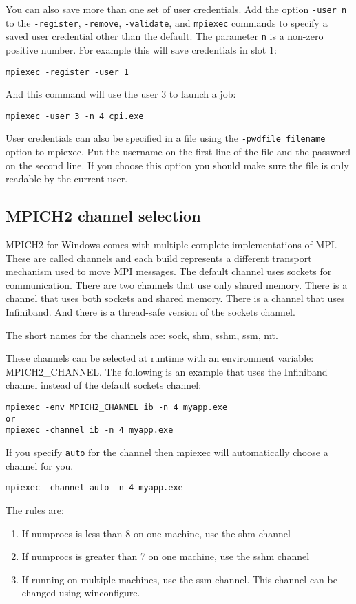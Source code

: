 \documentclass[dvipdfm,11pt]{article}
\begin{document}
You can also save more than one set of user credentials.  Add the option \texttt{-user n}
to the \texttt{-register}, \texttt{-remove}, \texttt{-validate}, and \texttt{mpiexec}
commands to specify a saved user credential other than the default.  The parameter \texttt{n}
is a non-zero positive number.  For example this will save credentials in slot 1:
\begin{verbatim}
mpiexec -register -user 1
\end{verbatim}
And this command will use the user 3 to launch a job:
\begin{verbatim}
mpiexec -user 3 -n 4 cpi.exe
\end{verbatim}

User credentials can also be specified in a file using the \texttt{-pwdfile filename}
option to mpiexec.  Put the username on the first line of the file and the password
on the second line.  If you choose this option you should make sure the file is
only readable by the current user.

\subsection{MPICH2 channel selection}
MPICH2 for Windows comes with multiple complete implementations of MPI.  These are called
channels and each build represents a different transport mechanism used to move MPI messages.
The default channel uses sockets for communication.  There are two channels that use only
shared memory.  There is a channel that uses both sockets and shared memory.  There is a
channel that uses Infiniband.  And there is a thread-safe version of the sockets channel.

The short names for the channels are: sock, shm, sshm, ssm, mt.

These channels can be selected at runtime with an environment variable: MPICH2\_CHANNEL.
The following is an example that uses the Infiniband channel instead of the default sockets
channel:

\begin{verbatim}
mpiexec -env MPICH2_CHANNEL ib -n 4 myapp.exe
or
mpiexec -channel ib -n 4 myapp.exe
\end{verbatim}

If you specify \texttt{auto} for the channel then mpiexec will automatically choose a
channel for you.
\begin{verbatim}
mpiexec -channel auto -n 4 myapp.exe
\end{verbatim}
The rules are:
\begin{enumerate}
\item If numprocs is less than 8 on one machine, use the shm channel
\item If numprocs is greater than 7 on one machine, use the sshm channel
\item If running on multiple machines, use the ssm channel.  This channel can be changed 
using winconfigure.
\end{enumerate}
\end{document}
